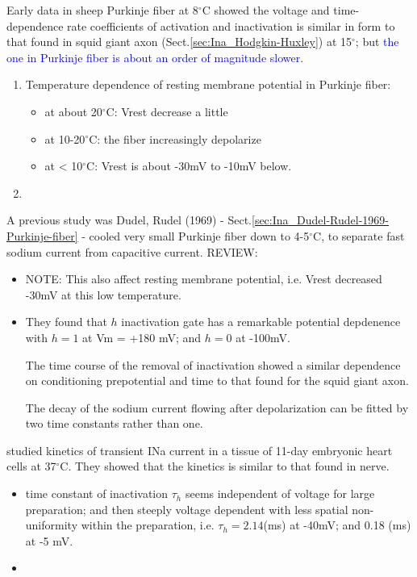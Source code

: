 Early data in sheep Purkinje fiber at 8$^\circ$C showed the voltage and
time-dependence rate coefficients of activation and inactivation is similar in
form to that found in squid giant axon (Sect.\ref{sec:Ina_Hodgkin-Huxley}) at
15$^\circ$; but \textcolor{blue}{the one in Purkinje fiber is about an order of
magnitude slower}.
\begin{enumerate}
  
  \item Temperature dependence of resting membrane potential in Purkinje fiber:
  \begin{itemize}
    \item at about 20$^\circ$C: Vrest decrease a little
    \item at 10-20$^\circ$C: the fiber increasingly depolarize
    \item at < 10$^\circ$C: Vrest is about -30mV to -10mV below.
  \end{itemize}
    
  \item   
\end{enumerate}

A previous study was Dudel, Rudel (1969) -
Sect.\ref{sec:Ina_Dudel-Rudel-1969-Purkinje-fiber} - cooled very small Purkinje
fiber down to 4-5$^\circ$C, to separate fast sodium current from capacitive
current. REVIEW:
\begin{itemize}
  \item    NOTE: This also affect resting membrane potential, i.e. Vrest decreased -30mV
  at this low temperature. 
  
  \item   They found that $h$ inactivation gate has a remarkable potential depdenence
  with $h=1$ at Vm = +180 mV; and $h=0$ at -100mV. 
 
  
  The time course of the removal of inactivation showed a similar dependence on
  conditioning prepotential and time to that found for the squid giant axon.
  
  The decay of the sodium current flowing after depolarization can be fitted by
  two time constants rather than one.
  
\end{itemize}
 
\citep{ebihara1980fsc}

\citep{ebihara1980iic} studied kinetics of transient INa current in a tissue of
11-day embryonic heart cells at 37$^\circ$C. They showed that the kinetics is
similar to that found in nerve.
\begin{itemize}
  \item time constant of inactivation $\tau_h$ seems independent of voltage for
  large preparation; and then steeply voltage dependent with less spatial
  non-uniformity within the preparation, i.e. $\tau_h = 2.14$(ms) at -40mV; and
  0.18 (ms) at -5 mV.
  
  \item 
\end{itemize}
  
